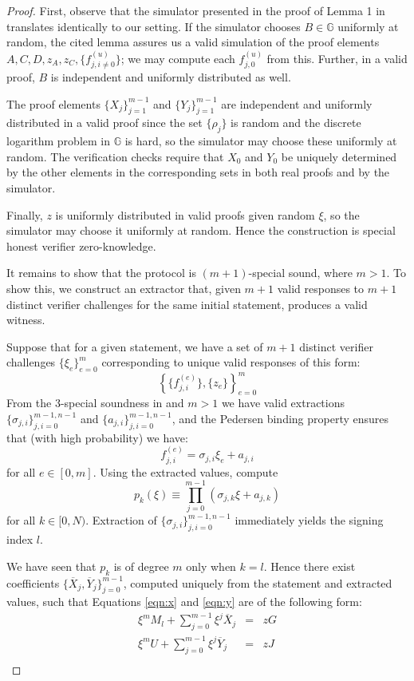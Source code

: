 \documentclass{article}
\newcommand{\G}{\mathbb{G}}
\newcommand{\sumj}{\sum_{j=0}^{m-1}}
\theoremstyle{definition}
\begin{document}
\begin{proof}
First, observe that the simulator presented in the proof of Lemma 1 in \cite{bootle} translates identically to our setting.
If the simulator chooses $B \in \G$ uniformly at random, the cited lemma assures us a valid simulation of the proof elements $A,C,D,z_A,z_C,\{f^{(u)}_{j,i \neq 0}\}$; we may compute each $f^{(u)}_{j,0}$ from this.
Further, in a valid proof, $B$ is independent and uniformly distributed as well.

The proof elements $\{X_j\}_{j=1}^{m-1}$ and $\{Y_j\}_{j=1}^{m-1}$ are independent and uniformly distributed in a valid proof since the set $\{\rho_j\}$ is random and the discrete logarithm problem in $\G$ is hard, so the simulator may choose these uniformly at random.
The verification checks require that $X_0$ and $Y_0$ be uniquely determined by the other elements in the corresponding sets in both real proofs and by the simulator.

Finally, $z$ is uniformly distributed in valid proofs given random $\xi$, so the simulator may choose it uniformly at random.
Hence the construction is special honest verifier zero-knowledge.

It remains to show that the protocol is $(m+1)$-special sound, where $m > 1$.
To show this, we construct an extractor that, given $m+1$ valid responses to $m+1$ distinct verifier challenges for the same initial statement, produces a valid witness.

Suppose that for a given statement, we have a set of $m+1$ distinct verifier challenges $\{\xi_e\}_{e=0}^m$ corresponding to unique valid responses of this form:
$$\left\{ \{f^{(e)}_{j,i}\}, \{z_e\} \right\}_{e=0}^m$$
From the $3$-special soundness in \cite{bootle} and $m > 1$ we have valid extractions $\{\sigma_{j,i}\}_{j,i=0}^{m-1,n-1}$ and $\{a_{j,i}\}_{j,i=0}^{m-1,n-1}$, and the Pedersen binding property ensures that (with high probability) we have:
$$f^{(e)}_{j,i} = \sigma_{j,i}\xi_e + a_{j,i}$$
for all $e \in [0,m]$.
Using the extracted values, compute
$$p_k(\xi) \equiv \prod_{j=0}^{m-1} \left( \sigma_{j,k}\xi + a_{j,k} \right)$$
for all $k \in [0,N)$.
Extraction of $\{\sigma_{j,i}\}_{j,i=0}^{m-1,n-1}$ immediately yields the signing index $l$.

We have seen that $p_k$ is of degree $m$ only when $k = l$.
Hence there exist coefficients $\{\overline{X}_j,\overline{Y}_j\}_{j=0}^{m-1}$, computed uniquely from the statement and extracted values, such that Equations \ref{eqn:x} and \ref{eqn:y} are of the following form:
\begin{eqnarray*}
\xi^m M_l + \sumj \xi^j\overline{X}_j &=& zG \\
\xi^m U + \sumj \xi^j\overline{Y}_j &=& zJ \\
\end{eqnarray*}


\end{proof}
\end{document}
